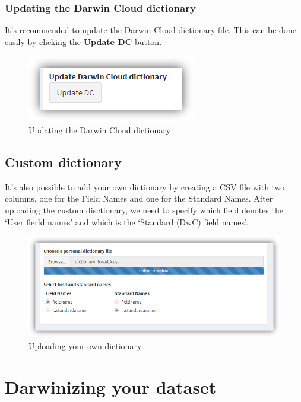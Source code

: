 \documentclass[]{book}
\theoremstyle{definition}
\theoremstyle{definition}
\theoremstyle{definition}
\theoremstyle{remark}
\begin{document}
\subsubsection*{Updating the Darwin Cloud
dictionary}\label{updating-the-darwin-cloud-dictionary}

It's recommended to update the Darwin Cloud dictionary file. This can be
done easily by clicking the \textbf{Update DC} button.

\begin{figure}
\centering
\includegraphics{img/bdDwC_update-DC.png}
\caption{Updating the Darwin Cloud dictionary}
\end{figure}

\subsection{Custom dictionary}\label{custom-dictionary}

It's also possible to add your own dictionary by creating a CSV file
with two columns, one for the Field Names and one for the Standard
Names. After uploading the custom disctionary, we need to specify which
field denotes the `User fierld names' and which is the `Standard (DwC)
field names'.

\begin{figure}
\centering
\includegraphics{img/bdDwC_personal_dictionary.png}
\caption{Uploading your own dictionary}
\end{figure}

\section{Darwinizing your dataset}\label{darwinizing-your-dataset}
\end{document}
